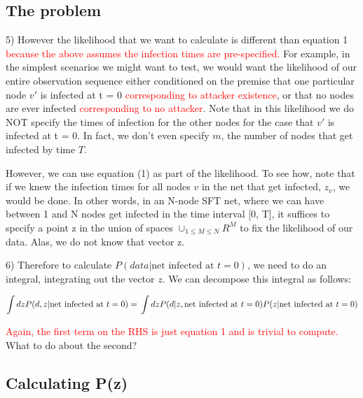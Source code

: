 \documentclass{article}
\begin{document}
\subsection{The problem}
	
        5) However the likelihood that we want to calculate is different than 
        equation 1 \textcolor{red}{because the above assumes the infection times 
        are pre-specified.}  For example, in the simplest scenarios we might want
	to test, we would want the likelihood of our entire observation
	sequence either conditioned on the premise that one particular node
	$v'$ is infected at t = 0 \textcolor{red}{corresponding to attacker 
        existence}, or that no nodes are ever infected \textcolor{red}
        {corresponding to no attacker}. Note that in this likelihood we do NOT 
        specify the times of infection for the other nodes for the case that 
        $v'$ is infected at t = 0. In fact, we don't even specify $m$, the number
        of nodes that get infected by time $T$.


	However, we can use equation (1) as part of the  likelihood. To see how, 
        note that if we knew the infection times for all nodes $v$ in the net 
        that get infected,  $z_{v}$,  we would be done.  In other words, in an 
        N-node SFT net, where we can have between 1 and N nodes get infected in 
        the time interval [0, T], it suffices to specify a point z in the union 
        of spaces $\cup_{1 \le M \le N} R^M$ to fix the likelihood of our data.
        Alas, we do not know that vector z.


	6) Therefore to calculate  $P(data  | \text{net infected at } t = 0)$, 
        we need to do an integral, integrating out the vector $z$. We can 
        decompose this integral as follows:

\begin{equation}
\int dz P(d, z | \text{net infected at } t = 0) = \\
\int dz P(d | z, \text{net infected at } t = 0) P(z | \text{net infected at } t=0)
\label{main}
\end{equation}

	  \textcolor{red}{Again, the first term on the RHS is just equation 1 and 
          is trivial to compute.} What to do about the second?

\subsection{Calculating P(z)}
        
\end{document}

